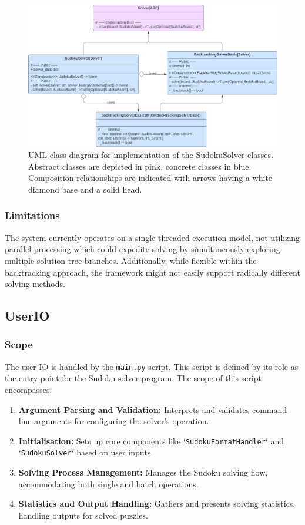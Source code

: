 \documentclass[11pt]{article}
\begin{document}
\begin{figure}[H]
    \centering
    \includegraphics[width=1\textwidth]{figs/UML_sudoku_solver.png}
    \caption{UML class diagram for implementation of the SudokuSolver classes. Abstract classes are depicted in pink, concrete classes in blue. Composition relationships are indicated with arrows having a white diamond base and a solid head.}
    \label{fig:sudoku_solver_uml}
\end{figure}


\subsubsection{Limitations}
The system currently operates on a single-threaded execution model, not utilizing parallel processing which could expedite solving by simultaneously exploring multiple solution tree branches. Additionally, while flexible within the backtracking approach, the framework might not easily support radically different solving methods.

\subsection{UserIO}
\subsubsection{Scope}
The user IO is handled by the \texttt{main.py} script. This script is defined by its role as the entry point for the Sudoku solver program. The scope of this script encompasses:

\begin{enumerate}
    \item \textbf{Argument Parsing and Validation:} Interprets and validates command-line arguments for configuring the solver's operation.
    \item \textbf{Initialisation:} Sets up core components like `\texttt{SudokuFormatHandler}` and `\texttt{SudokuSolver}` based on user inputs.
    \item \textbf{Solving Process Management:} Manages the Sudoku solving flow, accommodating both single and batch operations.
    \item \textbf{Statistics and Output Handling:} Gathers and presents solving statistics, handling outputs for solved puzzles.
\end{enumerate}
\end{document}
